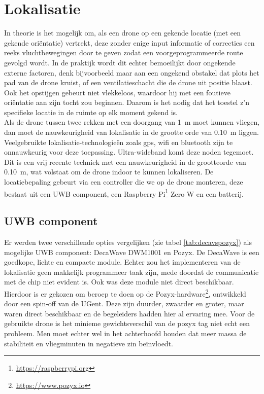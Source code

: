 \section{Lokalisatie} \label{sec:localization}
In theorie is het mogelijk om, als een drone op een gekende locatie (met een gekende ori\"entatie) vertrekt, deze zonder enige input informatie of correcties een reeks vluchtbewegingen door te geven zodat een voorgeprogrammeerde route gevolgd wordt.
In de praktijk wordt dit echter bemoeilijkt door ongekende externe factoren, denk bijvoorbeeld maar aan een ongekend obstakel dat plots het pad van de drone kruist, of een ventilatieschacht die de drone uit positie blaast.
Ook het opstijgen gebeurt niet vlekkeloos, waardoor hij met een foutieve ori\"entatie aan zijn tocht zou beginnen.
Daarom is het nodig dat het toestel z'n specifieke locatie in de ruimte op elk moment gekend is.\\

Als de drone tussen twee rekken met een doorgang van \SI{1}{\m} moet kunnen vliegen, dan moet de nauwkeurigheid van lokalisatie in de grootte orde van \SI{0.10}{\m} liggen.
Veelgebruikte lokalisatie-technologie\"en zoals gps, wifi en bluetooth zijn te onnauwkeurig voor deze toepassing.
Ultra-wideband komt deze noden tegemoet.
Dit is een vrij recente techniek met een nauwkeurigheid in de grootteorde van \SI{0.10}{\m}, wat volstaat om de drone indoor te kunnen lokaliseren.
De locatiebepaling gebeurt via een controller die we op de drone monteren, deze bestaat uit een UWB component, een Raspberry Pi\footnote{\url{https://raspberrypi.org}} Zero W en een batterij.\\

\subsection{UWB component} \label{sec:uwb}
Er werden twee verschillende opties vergelijken (zie tabel \ref{tab:decavspozyx}) als mogelijke UWB component: DecaWave DWM1001 en Pozyx.
De DecaWave is een goedkope, lichte en compacte module.
Echter zou het implementeren van de lokalisatie geen makkelijk programmeer taak zijn, mede doordat de communicatie met de chip niet evident is.
Ook was deze module niet direct beschikbaar. Hierdoor is er gekozen om beroep te doen op de Pozyx-hardware\footnote{\url{https://www.pozyx.io}}, ontwikkeld door een spin-off van de UGent. Deze zijn duurder, zwaarder en groter, maar waren direct beschikbaar en de begeleiders hadden hier al ervaring mee.
Voor de gebruikte drone is het minieme gewichtsverschil van de pozyx tag niet echt een probleem.
Men moet echter wel in het achterhoofd houden dat meer massa de stabiliteit en vliegminuten in negatieve zin be\"invloedt.\\

